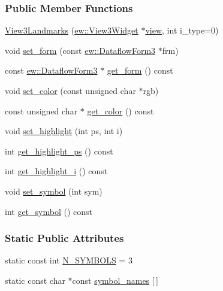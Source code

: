 \subsubsection*{Public Member Functions}
\begin{DoxyCompactItemize}
\item 
\hyperlink{classew_1_1View3Landmarks_ac2b94a222f9c767f376386648163e21e}{View3Landmarks} (\hyperlink{classew_1_1View3Widget}{ew::View3Widget} $\ast$\hyperlink{classew_1_1View3Item_a7d765842ec7b9e145cefa37e3dbae658}{view}, int i\_\-type=0)
\item 
void \hyperlink{classew_1_1View3Landmarks_a28b6615870a90c8179023827796bbc45}{set\_\-form} (const \hyperlink{classew_1_1DataflowForm3}{ew::DataflowForm3} $\ast$frm)
\item 
const \hyperlink{classew_1_1DataflowForm3}{ew::DataflowForm3} $\ast$ \hyperlink{classew_1_1View3Landmarks_ad41875336f92f693fa215137305a09ed}{get\_\-form} () const 
\item 
void \hyperlink{classew_1_1View3Landmarks_a72cad881f909b1105ef46ab53f9b2801}{set\_\-color} (const unsigned char $\ast$rgb)
\item 
const unsigned char $\ast$ \hyperlink{classew_1_1View3Landmarks_aff46a81fe7ec6bd3895dbe9ea6630230}{get\_\-color} () const 
\item 
void \hyperlink{classew_1_1View3Landmarks_a5215584e89b18fca5f9b53e6943d6ffe}{set\_\-highlight} (int ps, int i)
\item 
int \hyperlink{classew_1_1View3Landmarks_ad39299ed05ded5379e4f8749e8eaa2a3}{get\_\-highlight\_\-ps} () const 
\item 
int \hyperlink{classew_1_1View3Landmarks_a2c4b9e20c783af8f296868b04ad4711a}{get\_\-highlight\_\-i} () const 
\item 
void \hyperlink{classew_1_1View3Landmarks_ae6dfece42f463c68bfc76f3782fd5006}{set\_\-symbol} (int sym)
\item 
int \hyperlink{classew_1_1View3Landmarks_a6144e736708e87f05fe35fccc1963626}{get\_\-symbol} () const 
\end{DoxyCompactItemize}
\subsubsection*{Static Public Attributes}
\begin{DoxyCompactItemize}
\item 
static const int \hyperlink{classew_1_1View3Landmarks_a2aac16ae4a3bc617df69e9a881309011}{N\_\-SYMBOLS} = 3
\item 
static const char $\ast$const \hyperlink{classew_1_1View3Landmarks_acf1fcc64c77ecabaee9ad645a46a707c}{symbol\_\-names} \mbox{[}$\,$\mbox{]}
\end{DoxyCompactItemize}


